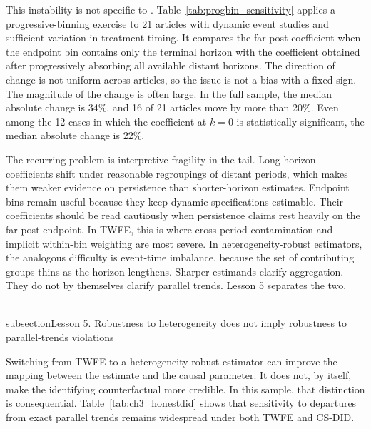 \documentclass[11pt]{article}
\begin{document}
This instability is not specific to \textcite{lawler2023effect}. Table~\ref{tab:progbin_sensitivity} applies a progressive-binning exercise to 21 articles with dynamic event studies and sufficient variation in treatment timing. It compares the far-post coefficient when the endpoint bin contains only the terminal horizon with the coefficient obtained after progressively absorbing all available distant horizons. The direction of change is not uniform across articles, so the issue is not a bias with a fixed sign. The magnitude of the change is often large. In the full sample, the median absolute change is 34\%, and 16 of 21 articles move by more than 20\%. Even among the 12 cases in which the coefficient at $k=0$ is statistically significant, the median absolute change is 22\%.

The recurring problem is interpretive fragility in the tail. Long-horizon coefficients shift under reasonable regroupings of distant periods, which makes them weaker evidence on persistence than shorter-horizon estimates. Endpoint bins remain useful because they keep dynamic specifications estimable. Their coefficients should be read cautiously when persistence claims rest heavily on the far-post endpoint. In TWFE, this is where cross-period contamination and implicit within-bin weighting are most severe. In heterogeneity-robust estimators, the analogous difficulty is event-time imbalance, because the set of contributing groups thins as the horizon lengthens. Sharper estimands clarify aggregation. They do not by themselves clarify parallel trends. Lesson 5 separates the two.





\newpage
\\subsection{Lesson 5. Robustness to heterogeneity does not imply robustness to parallel-trends violations}

Switching from TWFE to a heterogeneity-robust estimator can improve the mapping between the estimate and the causal parameter. It does not, by itself, make the identifying counterfactual more credible. In this sample, that distinction is consequential. Table~\ref{tab:ch3_honestdid} shows that sensitivity to departures from exact parallel trends remains widespread under both TWFE and CS-DID.
\end{document}

